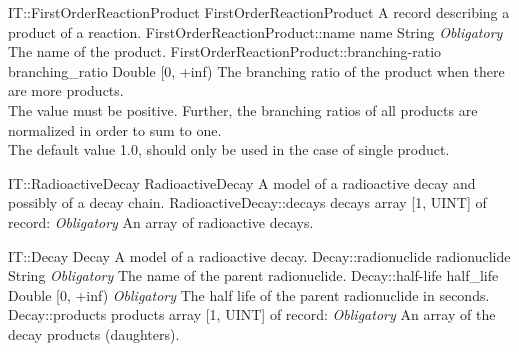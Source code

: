\begin{RecordType}
	{IT::FirstOrderReactionProduct}
	{FirstOrderReactionProduct}
	{}%
	{}%
	{{{A record describing a product of a reaction.}%
}}
		\RecKey
			{FirstOrderReactionProduct::name}
			{name}
			{{String}}{}
			{ \it{Obligatory}}
			{{{The name of the product.}%
}}
		\RecKey
			{FirstOrderReactionProduct::branching-ratio}
			{branching{\_}ratio}
			{{Double [0, +inf)}}{}
			{ }
			{{{The branching ratio of the product when there are more products.}\\{
The value must be positive.
Further, the branching ratios of all products are normalized in order to sum to one.}\\{
The default value 1.0, should only be used in the case of single product.}%
}}
\end{RecordType}
\begin{RecordType}
	{IT::RadioactiveDecay}
	{RadioactiveDecay}
	{}%
	{}%
	{{{A model of a radioactive decay and possibly of a decay chain.}%
}}
		\RecKey
			{RadioactiveDecay::decays}
			{decays}
			{{array [1, UINT] of }{record: }}{}
			{ \it{Obligatory}}
			{{{An array of radioactive decays.}%
}}
\end{RecordType}
\begin{RecordType}
	{IT::Decay}
	{Decay}
	{}%
	{}%
	{{{A model of a radioactive decay.}%
}}
		\RecKey
			{Decay::radionuclide}
			{radionuclide}
			{{String}}{}
			{ \it{Obligatory}}
			{{{The name of the parent radionuclide.}%
}}
		\RecKey
			{Decay::half-life}
			{half{\_}life}
			{{Double [0, +inf)}}{}
			{ \it{Obligatory}}
			{{{The half life of the parent radionuclide in seconds.}%
}}
		\RecKey
			{Decay::products}
			{products}
			{{array [1, UINT] of }{record: }}{}
			{ \it{Obligatory}}
			{{{An array of the decay products (daughters).}%
}}
\end{RecordType}
